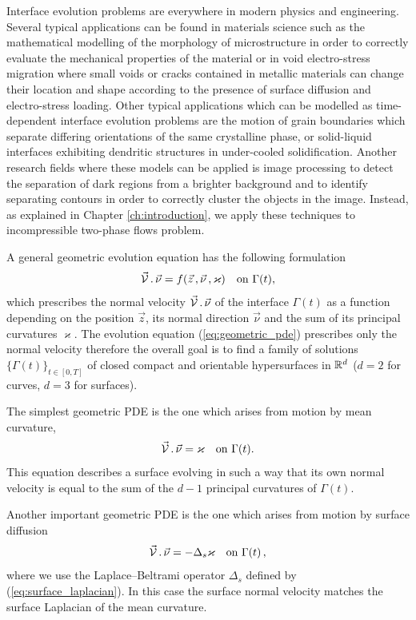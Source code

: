 Interface evolution problems are everywhere in modern physics and engineering.
Several typical applications can be found in materials science such as the
mathematical modelling of the morphology of microstructure in order to
correctly evaluate the mechanical properties of the material or in void
electro-stress migration where small voids or cracks contained in metallic
materials can change their location and shape according to the presence of
surface diffusion and electro-stress loading. Other typical applications which
can be modelled as time-dependent interface evolution problems are the motion of
grain boundaries which separate differing orientations of the same crystalline
phase, or solid-liquid interfaces exhibiting dendritic structures in
under-cooled solidification. Another research fields where these models can be
applied is image processing to detect the separation of dark regions from a
brighter background and to identify separating contours in order to correctly
cluster the objects in the image. Instead, as explained in Chapter
\ref{ch:introduction}, we apply these techniques to incompressible two-phase
flows problem.

A general geometric evolution equation has the following formulation
\begin{equation}\label{eq:geometric_pde}
\vec{\mathcal{V}}\,.\,\vec\nu=f(\vec{z}\,,\vec{\nu}\,,\varkappa)
\quad\mbox{on }\Gamma(t),
\end{equation}
which prescribes the normal velocity $\vec{\mathcal{V}}\,.\,\vec\nu$ of the
interface $\Gamma(t)$ as a function depending on the position $\vec z$, its
normal direction $\vec{\nu}$ and the sum of its principal curvatures
$\varkappa$. The evolution equation (\ref{eq:geometric_pde}) prescribes only
the normal velocity therefore the overall goal is to find a family of
solutions $\{ \Gamma(t) \}_{t \in [0, T]}$ of closed compact and orientable
hypersurfaces in ${\mathbb R}^{d}$ ($d = 2$ for curves, $d = 3$ for surfaces).

The simplest geometric PDE is the one which arises from motion by mean
curvature,
\begin{equation}\label{eq:mean_curvature}
\vec{\mathcal{V}}\,.\,\vec\nu=\varkappa\quad\mbox{on }\Gamma(t).
\end{equation}
This equation describes a surface evolving in such a way that its own normal
velocity is equal to the sum of the $d-1$ principal curvatures of $\Gamma(t)$.

Another important geometric PDE is the one which arises from motion by
surface diffusion
\begin{equation}\label{eq:surface_diff}
\vec{\mathcal{V}}\,.\,\vec\nu=-\Delta_s \varkappa \quad\mbox{on }\Gamma(t)\,,
\end{equation}
where we use the Laplace--Beltrami operator $\Delta_s$ defined by
(\ref{eq:surface_laplacian}). In this case the surface normal velocity matches
the surface Laplacian of the mean curvature.

